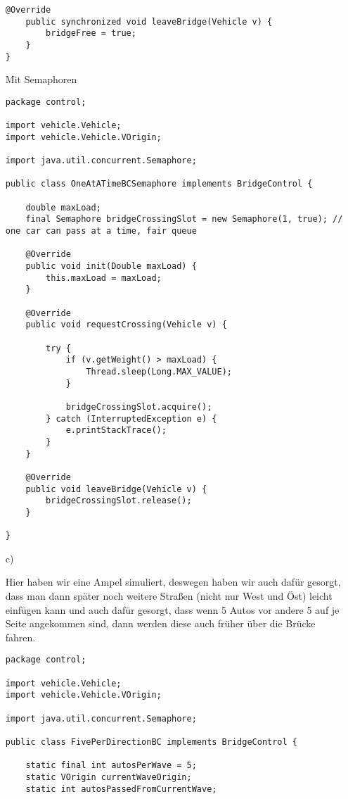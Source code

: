 \begin{itemize}
\begin{lstlisting}[style=java]
    @Override
    public synchronized void leaveBridge(Vehicle v) {
        bridgeFree = true;
    }
}

\end{lstlisting}

Mit Semaphoren
\begin{lstlisting}[style=java]
package control;

import vehicle.Vehicle;
import vehicle.Vehicle.VOrigin;

import java.util.concurrent.Semaphore;

public class OneAtATimeBCSemaphore implements BridgeControl {

    double maxLoad;
    final Semaphore bridgeCrossingSlot = new Semaphore(1, true); // one car can pass at a time, fair queue

    @Override
    public void init(Double maxLoad) {
        this.maxLoad = maxLoad;
    }

    @Override
    public void requestCrossing(Vehicle v) {

        try {
            if (v.getWeight() > maxLoad) {
                Thread.sleep(Long.MAX_VALUE);
            }

            bridgeCrossingSlot.acquire();
        } catch (InterruptedException e) {
            e.printStackTrace();
        }
    }

    @Override
    public void leaveBridge(Vehicle v) {
        bridgeCrossingSlot.release();
    }

}

\end{lstlisting}

\item[c)]

Hier haben wir eine Ampel simuliert, deswegen haben wir auch dafür gesorgt, dass man dann später noch weitere Straßen (nicht nur West und Öst) leicht einfügen kann und auch dafür gesorgt, 
dass wenn 5 Autos vor andere 5 auf je Seite angekommen sind, dann werden diese auch früher über die Brücke fahren.

\begin{lstlisting}[style=java]
package control;

import vehicle.Vehicle;
import vehicle.Vehicle.VOrigin;

import java.util.concurrent.Semaphore;

public class FivePerDirectionBC implements BridgeControl {

    static final int autosPerWave = 5;
    static VOrigin currentWaveOrigin;
    static int autosPassedFromCurrentWave;


\end{lstlisting}
\end{itemize}
